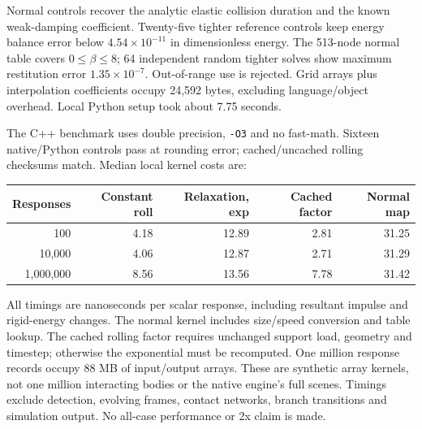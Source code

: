 \documentclass[10pt,a4paper]{article}
\begin{document}
Normal controls recover the analytic elastic collision duration and the known
weak-damping coefficient. Twenty-five tighter reference controls keep energy
balance error below $4.54\times10^{-11}$ in dimensionless energy. The 513-node
normal table covers $0\le\beta\le8$; 64 independent random tighter solves show
maximum restitution error $1.35\times10^{-7}$. Out-of-range use is rejected.
Grid arrays plus interpolation coefficients occupy 24,592 bytes, excluding
language/object overhead. Local Python setup took about 7.75 seconds.

The C++ benchmark uses double precision, \texttt{-O3} and no fast-math.
Sixteen native/Python controls pass at rounding error; cached/uncached rolling
checksums match. Median local kernel costs are:
\begin{center}\small\setlength{\tabcolsep}{4pt}
\begin{tabular}{rrrrr}\hline
Responses & Constant roll & Relaxation, exp & Cached factor & Normal map\\\hline
100 & 4.18 & 12.89 & 2.81 & 31.25 \\
10,000 & 4.06 & 12.87 & 2.71 & 31.29 \\
1,000,000 & 8.56 & 13.56 & 7.78 & 31.42 \\
\hline\end{tabular}\end{center}
All timings are nanoseconds per scalar response, including resultant impulse and
rigid-energy changes. The normal kernel includes size/speed conversion and table
lookup. The cached rolling factor requires unchanged support load, geometry and
timestep; otherwise the exponential must be recomputed. One million response
records occupy 88 MB of input/output arrays. These are synthetic array kernels,
not one million interacting bodies or the native engine's full scenes. Timings
exclude detection, evolving frames, contact networks, branch transitions and
simulation output. No all-case performance or 2x claim is made.
\end{document}
